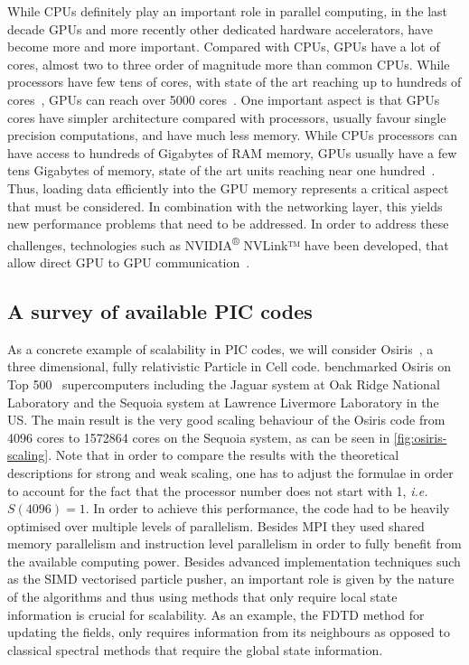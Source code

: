 \documentclass[12pt, class=report, crop=false]{standalone}
\begin{document}
While CPUs definitely play an important role in parallel computing, in the last
decade GPUs and more recently other dedicated hardware accelerators, have become
more and more important. Compared with CPUs, GPUs have a lot of cores, almost
two to three order of magnitude more than common CPUs. While processors have
few tens of cores, with state of the art reaching up to hundreds of
cores~\autocite{intelcorporation_intelxeon_2016, ibm_power9servers_2018,
vazhkudai_designdeployment_2018},
GPUs can reach over 5000 cores~\autocite{nvidiacorporation_nvidiatesla_2018}.
One important aspect is that GPUs cores have simpler architecture compared with
processors, usually favour single precision computations, and have much less memory.
While CPUs processors can have access to hundreds of Gigabytes of RAM memory,
GPUs usually have a few tens Gigabytes of memory, state of the art units reaching
near one hundred~\autocite{vazhkudai_designdeployment_2018}.\@
Thus, loading data efficiently into the GPU memory represents a critical aspect
that must be considered. In combination with the networking layer,
this yields new performance problems that need to be addressed.
In order to address these challenges, technologies such as
NVIDIA\textsuperscript{®} NVLink™ have been developed, that allow direct
GPU to GPU communication~\autocite{nvidiacorporation_nvidianvlink_2018}.

\subsection{A survey of available PIC codes}

As a concrete example of scalability in PIC codes, we will consider
Osiris~\autocite{fonseca_osiristhreedimensional_2002}, a three dimensional,
fully relativistic Particle in Cell code. \Textcite{fonseca_exploitingmultiscale_2013}
benchmarked Osiris on Top 500~\autocite{strohmaier_top500supercomputer_1993}
supercomputers including the Jaguar system at Oak Ridge National Laboratory
and the Sequoia system at Lawrence Livermore Laboratory in the US.\@
The main result is the very good scaling behaviour of the Osiris code from
4096 cores to 1572864 cores on the Sequoia system, as can be seen in \cref{fig:osiris-scaling}.
Note that in order to compare the results with the theoretical descriptions
for strong and weak scaling, one has to adjust the formulae in order to account
for the fact that the processor number does not start with 1, \emph{i.e.} \(S(4096)=1\).
In order to achieve this performance, the code had to be heavily optimised over
multiple levels of parallelism. Besides MPI they used shared memory parallelism
and instruction level parallelism in order to fully benefit from the available
computing power. Besides advanced implementation techniques such as the SIMD
vectorised particle pusher, an important role is given by the nature of the algorithms
and thus using methods that only require local state information is crucial for scalability.
As an example, the FDTD method for updating the fields, only requires information
from its neighbours as opposed to classical spectral methods that require the
global state information.
\end{document}
